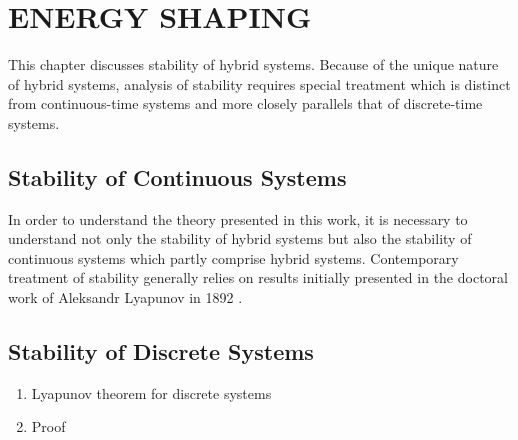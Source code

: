\chapter{\uppercase{Energy Shaping}}

This chapter discusses stability of hybrid systems. Because of the unique nature
of hybrid systems, analysis of stability requires special treatment which is
distinct from continuous-time systems and more closely parallels that of
discrete-time systems.

\section{Stability of Continuous Systems}

In order to understand the theory presented in this work, it is necessary to
understand not only the stability of hybrid systems but also the stability of
continuous systems which partly comprise hybrid systems.
%
Contemporary treatment of stability generally relies on results initially
presented in the doctoral work of Aleksandr Lyapunov in 1892 \cite{}.

\section{Stability of Discrete Systems}
\begin{enumerate}
\item Lyapunov theorem for discrete systems
\item Proof 
\end{enumerate}